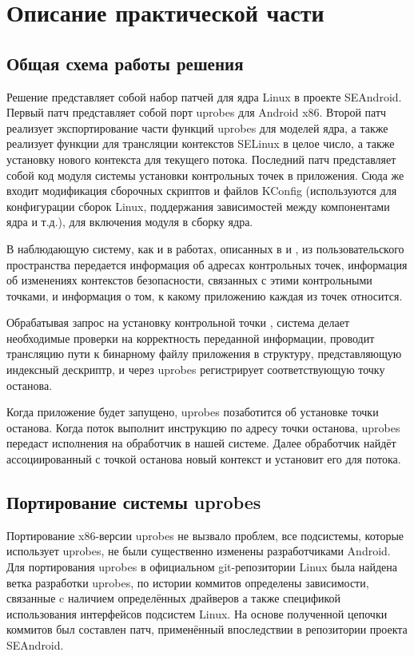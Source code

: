\newpage
\section{Описание практической части}

\subsection{Общая схема работы решения}

Решение представляет собой набор патчей для ядра Linux в проекте
SEAndroid. Первый патч представляет собой порт uprobes для Android x86.
Второй патч реализует экспортирование части функций uprobes для моделей
ядра, а также реализует функции для трансляции контекстов SELinux в
целое число, а также установку нового контекста для текущего потока.
Последний патч представляет собой код модуля системы установки
контрольных точек в приложения. Сюда же входит модификация сборочных
скриптов и файлов KConfig (используются для конфигурации сборок Linux,
поддержания зависимостей между компонентами ядра и т.д.), для включения
модуля в сборку ядра.

В наблюдающую систему, как и в работах, описанных в \cite{sacharov} и
\cite{bush}, из пользовательского пространства передается информация об
адресах контрольных точек, информация об изменениях контекстов
безопасности, связанных с этими контрольными точками, и информация о
том, к какому приложению каждая из точек относится. 

Обрабатывая запрос на установку контрольной точки , система делает
необходимые проверки на корректность переданной информации, проводит
трансляцию пути к бинарному файлу приложения в структуру, представляющую
индексный дескриптр, и через uprobes регистрирует соответствующую точку
останова. 

Когда приложение будет запущено, uprobes позаботится об установке точки
останова. Когда поток выполнит инструкцию по адресу точки останова,
uprobes передаст исполнения на обработчик в нашей системе. Далее
обработчик найдёт ассоциированный с точкой останова новый контекст и
установит его для потока.

\subsection{Портирование системы uprobes}

Портирование x86-версии uprobes не вызвало проблем, все подсистемы,
которые использует uprobes, не были существенно изменены разработчиками
Android. Для портирования uprobes в официальном git-репозитории Linux
была найдена ветка разработки uprobes, по истории коммитов определены
зависимости, связанные c наличием определённых драйверов а также
спецификой использования интерфейсов подсистем Linux. На основе
полученной цепочки коммитов был составлен патч, применённый впоследствии
в репозитории проекта SEAndroid.


